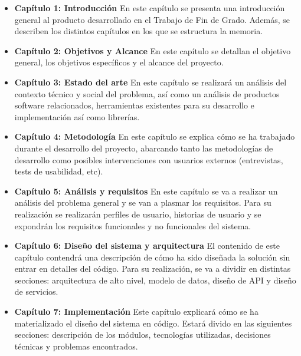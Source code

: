 \begin{itemize}
    \item \textbf{Capítulo 1: Introducción}
    \newline
    En este capítulo se presenta una introducción general al producto desarrollado en el Trabajo de Fin de Grado.
    Además, se describen los distintos capítulos en los que se estructura la memoria.

    \item \textbf{Capítulo 2: Objetivos y Alcance}
    \newline
    En este capítulo se detallan el objetivo general, los objetivos específicos y el alcance del proyecto.

    \item \textbf{Capítulo 3: Estado del arte}
    \newline
    En este capítulo se realizará un análisis del contexto técnico y social del problema, así como un análisis de productos
    software relacionados, herramientas existentes para su desarrollo e implementación así como librerías.

    \item \textbf{Capítulo 4: Metodología}
    \newline
    En este capítulo se explica cómo se ha trabajado durante el desarrollo del proyecto, abarcando tanto las metodologías
    de desarrollo como posibles intervenciones con usuarios externos (entrevistas, tests de usabilidad, etc).

    \item \textbf{Capítulo 5: Análisis y requisitos}
    \newline
    En este capítulo se va a realizar un análisis del problema general y se van a plasmar los requisitos. Para su
    realización se realizarán perfiles de usuario, historias de usuario y se expondrán los requisitos funcionales y
    no funcionales del sistema.

    \item \textbf{Capítulo 6: Diseño del sistema y arquitectura}
    \newline
    El contenido de este capítulo contendrá una descripción de cómo ha sido diseñada la solución sin entrar en detalles
    del código. Para su realización, se va a dividir en distintas secciones: arquitectura de alto nivel, modelo de datos,
    diseño de API y diseño de servicios.

    \item \textbf{Capítulo 7: Implementación}
    \newline
    Este capítulo explicará cómo se ha materializado el diseño del sistema en código. Estará divido en las siguientes
    secciones: descripción de los módulos, tecnologías utilizadas, decisiones técnicas y problemas encontrados.


\end{itemize}
